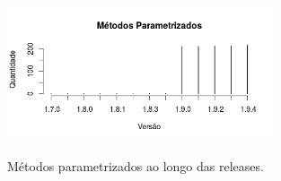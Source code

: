 	
	\begin{figure}[h]
		\center
		\includegraphics[width=0.7\textwidth]{Imagens/metodosParametrizados.png}
		\label{fig:metodosParametrizadosAnt}
		\caption{Métodos parametrizados ao longo das releases.}
	\end{figure}
